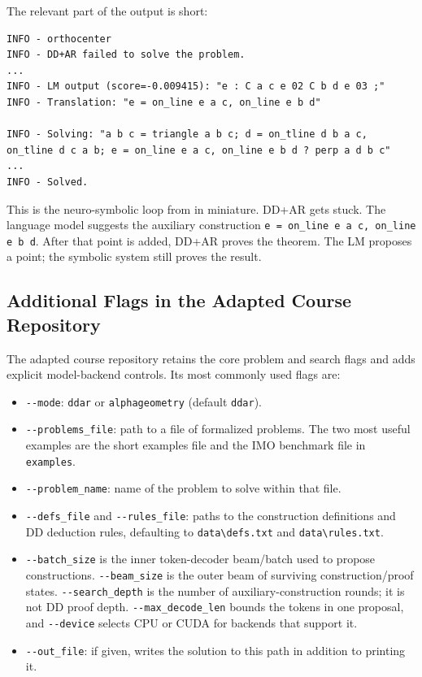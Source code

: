 \documentclass[reqno]{amsart}
\DeclareMathOperator{\1}{\textbf{1}}
\begin{document}
The relevant part of the output is short:
\begin{lstlisting}
INFO - orthocenter
INFO - DD+AR failed to solve the problem.
...
INFO - LM output (score=-0.009415): "e : C a c e 02 C b d e 03 ;"
INFO - Translation: "e = on_line e a c, on_line e b d"

INFO - Solving: "a b c = triangle a b c; d = on_tline d b a c, on_tline d c a b; e = on_line e a c, on_line e b d ? perp a d b c"
...
INFO - Solved.
\end{lstlisting}
This is the neuro-symbolic loop from  in miniature. DD+AR
gets stuck. The language model suggests the auxiliary construction
\verb|e = on_line e a c, on_line e b d|. After that point is added, DD+AR
proves the theorem. The LM proposes a point; the symbolic system still proves
the result.

\subsection{Additional Flags in the Adapted Course Repository}

The adapted course repository retains the core problem and search flags and
adds explicit model-backend controls.  Its most commonly used flags are:
\begin{itemize}
    \item \verb|--mode|: \verb|ddar| or \verb|alphageometry| (default
          \verb|ddar|).
    \item \verb|--problems_file|: path to a file of formalized problems. The
          two most useful examples are the short examples file and the IMO
          benchmark file in \verb|examples|.
    \item \verb|--problem_name|: name of the problem to solve within that
          file.
    \item \verb|--defs_file| and \verb|--rules_file|: paths to the
          construction definitions and DD deduction rules, defaulting to
          \verb|data\defs.txt| and \verb|data\rules.txt|.
    \item \verb|--batch_size| is the inner token-decoder beam/batch used to
          propose constructions. \verb|--beam_size| is the outer beam of
          surviving construction/proof states. \verb|--search_depth| is the
          number of auxiliary-construction rounds; it is not DD proof depth.
          \verb|--max_decode_len| bounds the tokens in one proposal, and
          \verb|--device| selects CPU or CUDA for backends that support it.
    \item \verb|--out_file|: if given, writes the solution to this path in
          addition to printing it.
\end{itemize}
\end{document}
